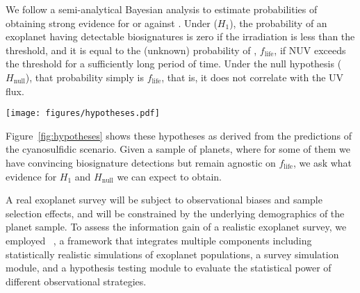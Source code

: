 \documentclass[twocolumn,twocolappendix,linenumbers]{aastex631}
\begin{document}
We  follow a semi-analytical Bayesian analysis to estimate probabilities of obtaining strong evidence for or against .
Under  ($H_1$), the probability of an exoplanet having detectable biosignatures is zero if the  irradiation is less than the threshold, and it is equal to the (unknown) probability of , $f_\mathrm{life}$, if \gls{NUV} exceeds the threshold for a sufficiently long period of time.
Under the null hypothesis ($H_\mathrm{null}$), that probability simply is $f_\mathrm{life}$, that is, it does not correlate with the \gls{UV} flux.

\begin{figure*}
    \begin{centering}
        \texttt{[image: figures/hypotheses.pdf]}
        \caption{UV~Threshold Hypothesis and null hypothesis derived from the cyanosulfidic scenario.}
        \label{fig:hypotheses}
    \end{centering}
\end{figure*}
Figure~\ref{fig:hypotheses} shows these hypotheses as derived from the predictions of the cyanosulfidic scenario.
Given a sample of planets, where for some of them we have convincing biosignature detections but remain agnostic on $f_\mathrm{life}$, we ask what evidence for $H_1$ and $H_\mathrm{null}$ we can expect to obtain.

A real exoplanet survey will be subject to observational biases and sample selection effects, and will be constrained by the underlying demographics of the planet sample.
To assess the information gain of a realistic exoplanet survey, we employed \bioverse~\citep{Bixel2021,Hardegree-Ullman2023,Schlecker2024,Hardegree-Ullman2025}, a framework that integrates multiple components including statistically realistic simulations of exoplanet populations, a survey simulation module, and a hypothesis testing module to evaluate the statistical power of different observational strategies.

\end{document}
